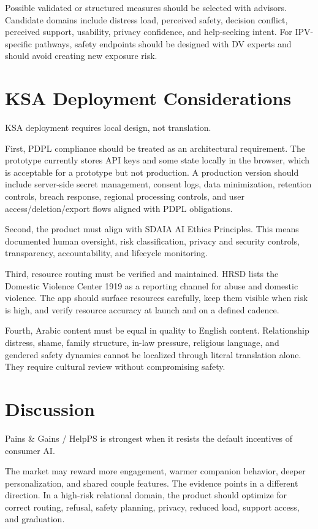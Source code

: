 \documentclass[11pt]{article}
\begin{document}
Possible validated or structured measures should be selected with advisors. Candidate domains include distress load, perceived safety, decision conflict, perceived support, usability, privacy confidence, and help-seeking intent. For IPV-specific pathways, safety endpoints should be designed with DV experts and should avoid creating new exposure risk.

\section{KSA Deployment Considerations}

KSA deployment requires local design, not translation.

First, PDPL compliance should be treated as an architectural requirement. The prototype currently stores API keys and some state locally in the browser, which is acceptable for a prototype but not production. A production version should include server-side secret management, consent logs, data minimization, retention controls, breach response, regional processing controls, and user access/deletion/export flows aligned with PDPL obligations.

Second, the product must align with SDAIA AI Ethics Principles. This means documented human oversight, risk classification, privacy and security controls, transparency, accountability, and lifecycle monitoring.

Third, resource routing must be verified and maintained. HRSD lists the Domestic Violence Center 1919 as a reporting channel for abuse and domestic violence. The app should surface resources carefully, keep them visible when risk is high, and verify resource accuracy at launch and on a defined cadence.

Fourth, Arabic content must be equal in quality to English content. Relationship distress, shame, family structure, in-law pressure, religious language, and gendered safety dynamics cannot be localized through literal translation alone. They require cultural review without compromising safety.

\section{Discussion}

Pains \& Gains / HelpPS is strongest when it resists the default incentives of consumer AI.

The market may reward more engagement, warmer companion behavior, deeper personalization, and shared couple features. The evidence points in a different direction. In a high-risk relational domain, the product should optimize for correct routing, refusal, safety planning, privacy, reduced load, support access, and graduation.
\end{document}
